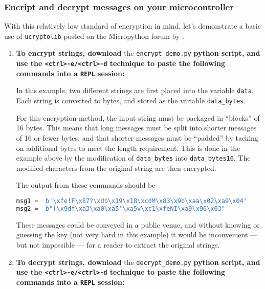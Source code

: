 \subsubsection{\howto Encript and decrypt messages on your microcontroller}
With this relatively low standard of encryption in mind, let's demonstrate a basic use of \lstinline{ucryptolib} posted on the Micropython forum by .
\begin{enumerate}
	\item \textbf{To encrypt strings, download} the \lstinline{encrypt_demo.py} \textbf{python script, and use the \lstinline{<ctrl>-e/<ctrl>-d} technique to paste the following commands into a \texttt{REPL} session:}


	In this example, two different strings are first placed into the variable \lstinline{data}.
	Each string is converted to bytes, and stored as the variable \lstinline{data_bytes}.

	For this encryption method, the input string must be packaged in ``blocks'' of 16 bytes.
	This means that long messages must be split into shorter messages of 16 or fewer bytes, and that shorter messages must be ``padded'' by tacking on additional bytes to meet the length requirement.
	This is done in the example above by the modification of \lstinline{data_bytes} into \lstinline{data_bytes16}.
	The modified characters from the original string are then encrypted.

	The output from these commands should be
\begin{lstlisting}[language=Python]
msg1 =  b'\xfe!F\x87?\xdb\x19\x18\xcdM\x83\x9b\xaa\x02\xa9\x04'
msg2 =  b"[\x9df\xa3\xa0\xa5'\xa5v\xc1\xfeNI\xa9\x96\x03"
\end{lstlisting}
	These messages could be conveyed in a public venue, and without knowing or guessing the key (not very hard in this example) it would be inconvenient --- but not impossible --- for a reader to extract the original strings.

	\item \textbf{To decrypt strings, download} the \lstinline{decrypt_demo.py} \textbf{python script, and use the \lstinline{<ctrl>-e/<ctrl>-d} technique to paste the following commands into a \texttt{REPL} session:}



\end{enumerate}
